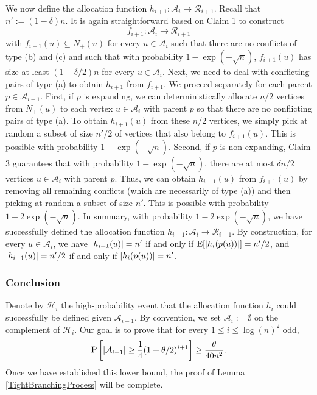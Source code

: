 \documentclass[11pt]{article}
\renewcommand{\P}{\mathrm{P}}
\newcommand{\A}{\mathcal{A}}
\DeclarePairedDelimiter{\abs}{\lvert}{\rvert}
\theoremstyle{remark}
\begin{document}
We now define the allocation function $h_{i+1} : \A_{i} \to \mathcal R_{i+1}$. Recall that $n' := (1-\delta)n$. It is again straightforward based on Claim 1 to construct 
\begin{equation}
    f_{i+1} : \A_{i} \to \mathcal R_{i+1}
\end{equation}
with $f_{i+1}(u) \subseteq N_+(u)$ for every $u \in \A_{i}$ such that there are no conflicts of type (b) and (c) and such that with probability $1-\exp(-\sqrt{n})$, $f_{i+1}(u)$ has size at least $(1-\delta/2)n$ for every $u \in \A_{i}$. 
Next, we need to deal with conflicting pairs of type (a) to obtain $h_{i+1}$ from $f_{i+1}$. We proceed separately for each parent $p \in \A_{i-1}$. 
First, if $p$ is expanding, we can deterministically allocate $n/2$ vertices from $N_+(u)$ to each vertex $u \in \A_i$ with parent $p$ so that there are no conflicting pairs of type (a). To obtain $h_{i+1}(u)$ from these $n/2$ vertices, we simply pick at random a subset of size $n'/2$ of vertices that also belong to $f_{i+1}(u)$. This is possible with probability $1-\exp(-\sqrt{n})$. 
Second, if $p$ is non-expanding, Claim 3 guarantees that with probability $1- \exp(-\sqrt{n})$, there are at most $\delta n / 2$ vertices $u \in \A_i$ with parent $p$. Thus, we can obtain $h_{i+1}(u)$ from $f_{i+1}(u)$ by removing all remaining conflicts (which are necessarily of type (a)) and then picking at random a subset of size $n'$. This is possible with probability $1-2\exp(-\sqrt{n})$.   
In summary, with probability $1-2\exp(-\sqrt{n})$, we have successfully defined the allocation function $h_{i+1} : \A_{i} \to \mathcal R_{i+1}$. By construction, for every $u \in \A_i$, we have
$\abs{h_{i+1}(u)} = n'$ if and only if $\mathrm E[\abs{h_{i}(p(u))}] = n'/2$, and $\abs{h_{i+1}(u)} = n'/2$ if and only if $\abs{h_{i}(p(u))} = n'$.

\subsubsection{Conclusion}

    Denote by $\mathcal{H}_i$ the high-probability event that the allocation function $h_i$ could successfully be defined given $\mathcal A_{i-1}$. By convention, we set $\mathcal A_i := \emptyset$ on the complement of $\mathcal{H}_i$. 
    Our goal is to prove that for every $1\le i \le \log(n)^2$ odd,
    \begin{equation}\label{eq:conclusion}
        \P\left[\abs{\A_{i+1}} \ge \frac{1}{4} (1+\theta/2)^{i+1}\right] \geq \frac{\theta}{40n^2}.
    \end{equation}
    Once we have established this lower bound, the proof of Lemma \ref{TightBranchingProcess} will be complete.
\end{document}
